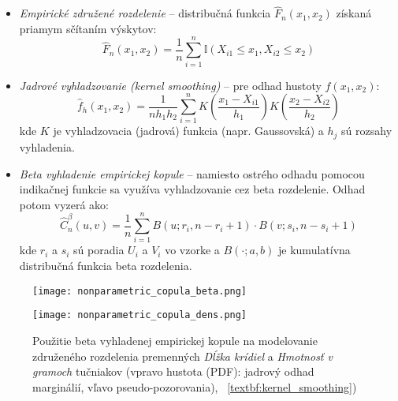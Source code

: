 \begin{itemize}
  \item \textit{Empirické združené rozdelenie} – distribučná funkcia $\hat{F}_n(x_1, x_2)$ získaná priamym sčítaním výskytov:
  \begin{equation}
  \hat{F}_n(x_1, x_2) = \frac{1}{n} \sum_{i=1}^{n} \mathbb{I}(X_{i1} \leq x_1, X_{i2} \leq x_2)
  \end{equation}
  \item \textit{Jadrové vyhladzovanie (kernel smoothing)} – pre odhad hustoty $f(x_1, x_2)$:
  \begin{equation}
  \hat{f}_h(x_1, x_2) = \frac{1}{n h_1 h_2} \sum_{i=1}^{n} K\left( \frac{x_1 - X_{i1}}{h_1} \right) K\left( \frac{x_2 - X_{i2}}{h_2} \right)
  \end{equation}
  kde $K$ je vyhladzovacia (jadrová) funkcia (napr. Gaussovská) a $h_j$ sú rozsahy vyhladenia.

  \item \textit{Beta vyhladenie empirickej kopule} – namiesto ostrého odhadu pomocou indikačnej funkcie sa využíva vyhladzovanie cez beta rozdelenie. Odhad potom vyzerá ako:
  \begin{equation}
    \hat{C}_n^{\beta}(u, v) = \frac{1}{n} \sum_{i=1}^n B(u; r_i, n - r_i + 1) \cdot B(v; s_i, n - s_i + 1)
  \end{equation}
  kde $r_i$ a $s_i$ sú poradia $U_i$ a $V_i$ vo vzorke a $B(\cdot; a,b)$ je kumulatívna distribučná funkcia beta rozdelenia.
  
\end{itemize}

\begin{figure}[H]
    \centering
    \begin{minipage}[t]{0.48\linewidth}
        \centering
        \texttt{[image: nonparametric\_copula\_beta.png]}
    \end{minipage}
    \hfill
    \begin{minipage}[t]{0.48\linewidth}
        \centering
        \texttt{[image: nonparametric\_copula\_dens.png]}
    \end{minipage}
    \caption{Použitie beta vyhladenej empirickej kopule na modelovanie združeného rozdelenia premenných \textit{Dĺžka krídiel} a \textit{Hmotnosť v gramoch} tučniakov (vpravo hustota (PDF): jadrový odhad marginálií, vľavo pseudo-pozorovania), ~\ref{textbf:kernel_smoothing})}
    \label{fig:empcopula}
\end{figure}


